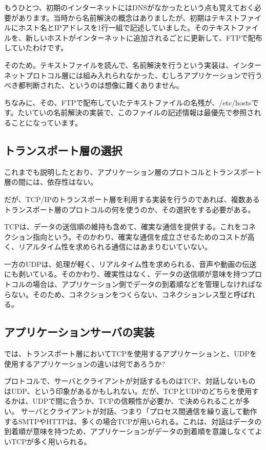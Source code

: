 もうひとつ、初期のインターネットにはDNSがなかったという点も覚えておく必要があります。当時から名前解決の概念はありましたが、初期はテキストファイルにホスト名とIPアドレスを1行一組で記述していました。そのテキストファイルを、新しいホストがインターネットに追加されるごとに更新して、FTPで配布していたわけです。

そのため。テキストファイルを読んで、名前解決を行うという実装は、インターネットプロトコル層には組み入れられなかった、むしろアプリケーションで行うべき都判断された、というのは想像に難くありません。

ちなみに、その、FTPで配布していたテキストファイルの名残が、/etc/hostsです。たいていの名前解決の実装で、このファイルの記述情報は最優先で参照されることになっています。


\subsection{トランスポート層の選択}
これまでも説明したとおり、アプリケーション層のプロトコルとトランスポート層の間には、依存性はない。

だが、TCP/IPのトランスポート層を利用する実装を行うのであれば、複数あるトランスポート層のプロトコルの何を使うのか、その選択をする必要がある。

TCPは、データの送信順の維持も含めて、確実な通信を提供する。これをコネクション指向という。そのかわり、確実な通信を成立させるためのコストが高く、リアルタイム性を求められる通信にはあまりむいていない。

一方のUDPは、処理が軽く、リアルタイム性を求められる、音声や動画の伝送にも剥いている。そのかわり、確実性はなく、データの送信順が意味を持つプロトコルの場合は、アプリケーション側でデータの到着順などを管理しなければならない。そのため、コネクションをつくらない、コネクションレス型と呼ばれる。


\subsection{アプリケーションサーバの実装}

では、トランスポート層においてTCPを使用するアプリケーションと、UDPを使用するアプリケーションの違いは何であろうか?

プロトコルで、サーバとクライアントが対話するものはTCP、対話しないものはUDP、という印象があるかもしれない。だが、TCPとUDPのどちらを使用するかは、UDPで間に合うか、TCPの信頼性が必要か、で決められることが多い。
サーバとクライアントが対話、つまり「プロセス間通信を繰り返して動作するSMTPやHTTPは、多くの場合TCPが用いられる。これは、対話はデータの到着順が意味を持つため、アプリケーションがデータの到着順を意識しなくてよいTCPが多く用いられる。

